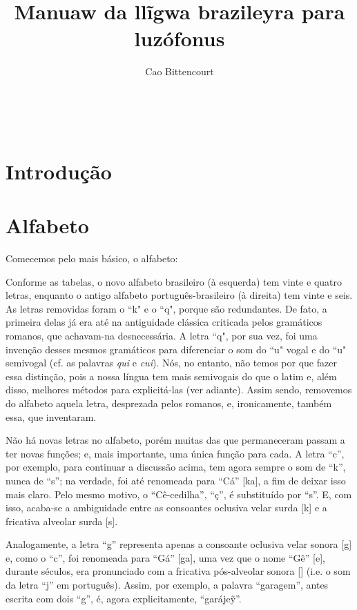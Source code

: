 \documentclass[12pt, a5paper, titlepage]{article}
\title{Manuaw da llĩgwa brazileyra para luzófonus}
\author{Cao Bittencourt}
\date{}
\begin{document}
\maketitle
\thispagestyle{empty}

\newpage \
\thispagestyle{empty}

\newpage
\begin{bilingualpages}
    \rightpage
    \section{Introdução}
    
    \newpage
    \section{Alfabeto}
    Comecemos pelo mais básico, o alfabeto:
    
    \PtTableAbc
    Conforme as tabelas, o novo alfabeto brasileiro (à esquerda) tem vinte e quatro letras, enquanto o antigo alfabeto português-brasileiro (à direita) tem vinte e seis. As letras removidas foram o ``k" e o ``q", porque são redundantes. De fato, a primeira delas já era até na antiguidade clássica criticada pelos gramáticos romanos, que achavam-na desnecessária. A letra ``q", por sua vez, foi uma invenção desses mesmos gramáticos para diferenciar o som do ``u" vogal e do ``u" semivogal (cf. as palavras \textit{qui} e \textit{cui}). Nós, no entanto, não temos por que fazer essa distinção, pois a nossa língua tem mais semivogais do que o latim e, além disso, melhores métodos para explicitá-las (ver adiante). Assim sendo, removemos do alfabeto aquela letra, desprezada pelos romanos, e, ironicamente, também essa, que inventaram.

    Não há novas letras no alfabeto, porém muitas das que permaneceram passam a ter novas funções; e, mais importante, uma única função para cada. A letra ``c'', por exemplo, para continuar a discussão acima, tem agora sempre o som de ``k'', nunca de ``s''; na verdade, foi até renomeada para ``Cá'' [ka], a fim de deixar isso mais claro. Pelo mesmo motivo, o ``Cê-cedilha'', ``ç'', é substituído por ``s''. E, com isso, acaba-se a ambiguidade entre as consoantes oclusiva velar surda [k] e a fricativa alveolar surda [s].

    Analogamente, a letra ``g'' representa apenas a consoante oclusiva velar sonora [g] e, como o ``c'', foi renomeada para ``Gá'' [ga], uma vez que o nome ``Gê'' [\textyogh e], durante séculos, era pronunciado com a fricativa pós-alveolar sonora [\textyogh] (i.e. o som da letra ``j'' em português). Assim, por exemplo, a palavra ``garagem'', antes escrita com dois ``g'', é, agora explicitamente, ``garáje\~y''.


\end{bilingualpages}
\end{document}
